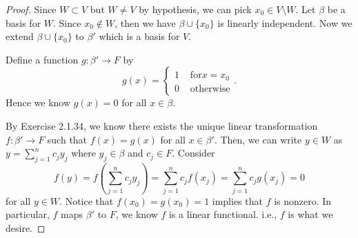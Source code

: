 \begin{Exercise}
	\begin{proof}
		Since $W\subset V$ but $W\neq V$ by hypothesis, we can pick $x_0\in V\setminus W$. Let $\beta$ be a basis for $W$. Since $x_0\notin W$, then we have $\beta\cup \{x_0\}$ is linearly independent. Now we extend $\beta\cup \{x_0\}$ to $\beta'$ which is a basis for $V$.
		
		Define a function $g:\beta'\to F$ by 
		$$
		g(x)=\begin{cases}
		1 & \mbox{ for} x=x_0 \\
		0 & \mbox{ otherwise}
		\end{cases}.
		$$
		Hence we know $g(x)=0$ for all $x\in \beta$.
		
		By Exercise 2.1.34, we know there exists the unique linear transformation $f:\beta'\to F$ such that $f(x)=g(x)$ for all $x\in \beta'$. Then, we can write $y\in W$ as $y=\sum_{j=1}^{n} c_j y_j$ where $y_j\in \beta$ and $c_j\in F$. Consider
		$$
		f(y) = f(\sum_{j=1}^{n} c_j y_j) 
		= \sum_{j=1}^{n} c_j f(x_j)
		= \sum_{j=1}^{n} c_j g(x_j)
		= 0
		$$
		for all $y\in W$.
		Notice that $f(x_0) = g(x_0) = 1$ implies that $f$ is nonzero. In particular, $f$ maps $\beta'$ to $F$, we know $f$ is a linear functional. i.e., $f$ is what we desire.
	\end{proof}
\end{Exercise}